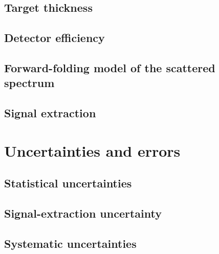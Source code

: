 \documentclass[aps,pra,reprint,superscriptaddress,nofootinbib,floatfix]{revtex4-2}
\begin{document}

\subsection{Target thickness}
\label{sec:target}


\subsection{Detector efficiency}
\label{sec:eff}


\subsection{Forward-folding model of the scattered spectrum}
\label{sec:fold}


\subsection{Signal extraction}
\label{sec:extract}


\section{Uncertainties and errors}
\label{sec:uncertainties}


\subsection{Statistical uncertainties}


\subsection{Signal-extraction uncertainty}


\subsection{Systematic uncertainties}
\end{document}
